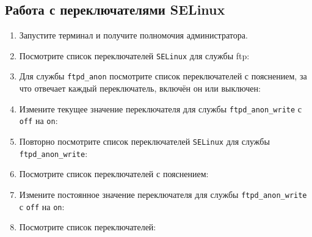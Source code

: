 \documentclass[12pt]{article}
\begin{document}
\subsection{Работа с переключателями SELinux}
\begin{enumerate}
	\item Запустите терминал и получите полномочия администратора.
	\item Посмотрите список переключателей \texttt{SELinux} для службы ftp:
	\item Для службы \texttt{ftpd\_anon} посмотрите список переключателей с пояснением, за что отвечает каждый переключатель, включён он или выключен:
	\item Измените текущее значение переключателя для службы \texttt{ftpd\_anon\_write} с \texttt{off} на \texttt{on}:
	\item Повторно посмотрите список переключателей \texttt{SELinux} для службы \texttt{ftpd\_anon\_write}:
	\item Посмотрите список переключателей с пояснением:
	\item Измените постоянное значение переключателя для службы \texttt{ftpd\_anon\_write} с \texttt{off} на \texttt{on}:
	\item Посмотрите список переключателей:
\end{enumerate}
\end{document}

